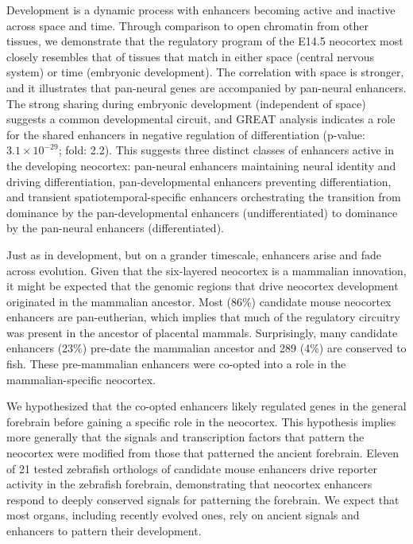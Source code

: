 Development is a dynamic process with enhancers becoming active and inactive across space and time.   Through comparison to open chromatin
from other tissues, we demonstrate that the regulatory program of the E14.5 neocortex most closely resembles that of tissues that match in
either space (central nervous system) or time (embryonic development).  The correlation with space is stronger, and it illustrates that
pan-neural genes are accompanied by pan-neural enhancers.  The strong sharing during embryonic development (independent of space) suggests
a common developmental circuit, and GREAT analysis indicates a role for the shared enhancers in negative regulation of differentiation
(p-value: $3.1\times10^{-29}$; fold: 2.2).  This suggests three distinct classes of enhancers active in the developing
neocortex: pan-neural enhancers maintaining neural identity and driving differentiation, pan-developmental enhancers preventing differentiation,
and transient spatiotemporal-specific enhancers orchestrating the transition from dominance by the pan-developmental enhancers (undifferentiated)
to dominance by the pan-neural enhancers (differentiated).

Just as in development, but on a grander timescale, enhancers arise and fade across evolution.  Given that the six-layered neocortex is a
mammalian innovation, it might be expected that the genomic regions that drive neocortex development originated in the mammalian ancestor.
Most (86\%) candidate mouse neocortex enhancers are pan-eutherian, which implies that much of the regulatory circuitry was present in the
ancestor of placental mammals.  Surprisingly, many candidate enhancers (23\%) pre-date the mammalian ancestor and 289 (4\%) are conserved to fish.
These pre-mammalian enhancers were co-opted into a role in the mammalian-specific neocortex.

We hypothesized that the co-opted enhancers likely regulated genes in the general forebrain before gaining a specific role in the neocortex.
This hypothesis implies more generally that the signals and transcription factors that pattern the neocortex were modified from those that
patterned the ancient forebrain.  Eleven of 21 tested zebrafish orthologs of candidate mouse enhancers drive reporter activity in the zebrafish forebrain, demonstrating
that neocortex enhancers respond to deeply conserved signals for patterning the forebrain.  We expect that most organs, including recently evolved
ones, rely on ancient signals and enhancers to pattern their development.

